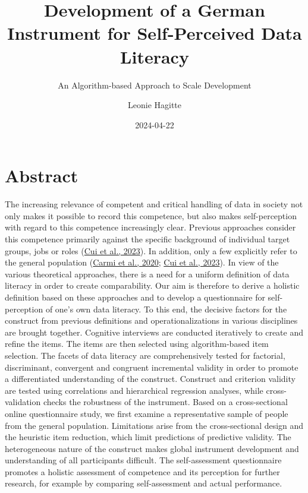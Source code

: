 \documentclass[
  12pt,
  a4paper,
  twoside]{article}
\title{Development of a German Instrument for Self-Perceived Data Literacy}
\subtitle{An Algorithm-based Approach to Scale Development}
\author{Leonie Hagitte}
\date{2024-04-22}
\begin{document}
\maketitle

{
\setcounter{tocdepth}{2}
\tableofcontents
}
\newpage\null\thispagestyle{empty}\newpage

\hypertarget{abstract}{%
\section*{Abstract}\label{abstract}}

The increasing relevance of competent and critical handling of data in society not only makes it possible to record this competence, but also makes self-perception with regard to this competence increasingly clear. Previous approaches consider this competence primarily against the specific background of individual target groups, jobs or roles (\protect\hyperlink{ref-Cui2023}{Cui et al., 2023}). In addition, only a few explicitly refer to the general population (\protect\hyperlink{ref-Carmi2020}{Carmi et al., 2020}; \protect\hyperlink{ref-Cui2023}{Cui et al., 2023}). In view of the various theoretical approaches, there is a need for a uniform definition of data literacy in order to create comparability.
Our aim is therefore to derive a holistic definition based on these approaches and to develop a questionnaire for self-perception of one's own data literacy. To this end, the decisive factors for the construct from previous definitions and operationalizations in various disciplines are brought together. Cognitive interviews are conducted iteratively to create and refine the items. The items are then selected using algorithm-based item selection. The facets of data literacy are comprehensively tested for factorial, discriminant, convergent and congruent incremental validity in order to promote a differentiated understanding of the construct. Construct and criterion validity are tested using correlations and hierarchical regression analyses, while cross-validation checks the robustness of the instrument.
Based on a cross-sectional online questionnaire study, we first examine a representative sample of people from the general population. Limitations arise from the cross-sectional design and the heuristic item reduction, which limit predictions of predictive validity. The heterogeneous nature of the construct makes global instrument development and understanding of all participants difficult.
The self-assessment questionnaire promotes a holistic assessment of competence and its perception for further research, for example by comparing self-assessment and actual performance.
\end{document}
